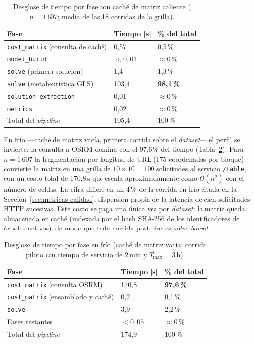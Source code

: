 \begin{table}[H]
  \centering
  \caption{Desglose de tiempo por fase con caché de matriz caliente ($n=1\,607$; media de las 18 corridas de la grilla).}
  \label{tab:fases-caliente}
  \begin{tabularx}{\textwidth}{lXX}
    \toprule
    Fase & Tiempo [s] & \% del total \\
    \midrule
    \texttt{cost\_matrix} (consulta de caché) & 0{,}57 & 0{,}5\,\% \\
    \texttt{model\_build} & $<0{,}01$ & $\approx 0$\,\% \\
    \texttt{solve} (primera solución) & 1{,}4 & 1{,}3\,\% \\
    \texttt{solve} (metaheurística GLS) & 103{,}4 & \textbf{98{,}1\,\%} \\
    \texttt{solution\_extraction} & 0{,}01 & $\approx 0$\,\% \\
    \texttt{metrics} & 0{,}02 & $\approx 0$\,\% \\
    \midrule
    Total del \textit{pipeline} & 105{,}4 & 100\,\% \\
    \bottomrule
  \end{tabularx}
\end{table}

En frío ---caché de matriz vacía, primera corrida sobre el \textit{dataset}---
el perfil se invierte: la consulta a OSRM domina con el 97,6\,\% del tiempo
(Tabla~\ref{tab:fases-frio}). Para $n=1\,607$ la fragmentación por longitud de
URL (175 coordenadas por bloque) convierte la matriz en una grilla de
$10 \times 10 = 100$ solicitudes al servicio \texttt{/table}, con un costo
total de 170{,}8\,s que escala aproximadamente como $O(n^2)$ con el número de
celdas. La cifra difiere en un 4\,\% de la corrida en frío citada en la
Sección~\ref{sec:metricas-calidad}, dispersión propia de la latencia de cien
solicitudes HTTP sucesivas. Este costo se paga una única vez por \textit{dataset}: la matriz queda
almacenada en caché (indexada por el hash SHA-256 de los identificadores de
árboles activos), de modo que toda corrida posterior es \textit{solve-bound}.

\begin{table}[H]
  \centering
  \caption{Desglose de tiempo por fase en frío (caché de matriz vacía; corrida piloto con tiempo de servicio de 2\,min y $T_{\max}=3$\,h).}
  \label{tab:fases-frio}
  \begin{tabularx}{\textwidth}{lXX}
    \toprule
    Fase & Tiempo [s] & \% del total \\
    \midrule
    \texttt{cost\_matrix} (consulta OSRM) & 170{,}8 & \textbf{97{,}6\,\%} \\
    \texttt{cost\_matrix} (ensamblado y caché) & 0{,}2 & 0{,}1\,\% \\
    \texttt{solve} & 3{,}9 & 2{,}2\,\% \\
    Fases restantes & $<0{,}05$ & $\approx 0$\,\% \\
    \midrule
    Total del \textit{pipeline} & 174{,}9 & 100\,\% \\
    \bottomrule
  \end{tabularx}
\end{table}

